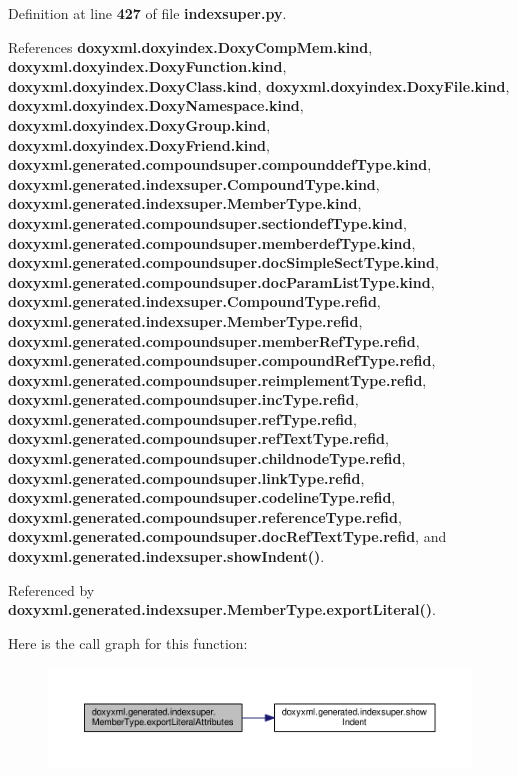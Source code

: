 Definition at line {\bf 427} of file {\bf indexsuper.\+py}.



References {\bf doxyxml.\+doxyindex.\+Doxy\+Comp\+Mem.\+kind}, {\bf doxyxml.\+doxyindex.\+Doxy\+Function.\+kind}, {\bf doxyxml.\+doxyindex.\+Doxy\+Class.\+kind}, {\bf doxyxml.\+doxyindex.\+Doxy\+File.\+kind}, {\bf doxyxml.\+doxyindex.\+Doxy\+Namespace.\+kind}, {\bf doxyxml.\+doxyindex.\+Doxy\+Group.\+kind}, {\bf doxyxml.\+doxyindex.\+Doxy\+Friend.\+kind}, {\bf doxyxml.\+generated.\+compoundsuper.\+compounddef\+Type.\+kind}, {\bf doxyxml.\+generated.\+indexsuper.\+Compound\+Type.\+kind}, {\bf doxyxml.\+generated.\+indexsuper.\+Member\+Type.\+kind}, {\bf doxyxml.\+generated.\+compoundsuper.\+sectiondef\+Type.\+kind}, {\bf doxyxml.\+generated.\+compoundsuper.\+memberdef\+Type.\+kind}, {\bf doxyxml.\+generated.\+compoundsuper.\+doc\+Simple\+Sect\+Type.\+kind}, {\bf doxyxml.\+generated.\+compoundsuper.\+doc\+Param\+List\+Type.\+kind}, {\bf doxyxml.\+generated.\+indexsuper.\+Compound\+Type.\+refid}, {\bf doxyxml.\+generated.\+indexsuper.\+Member\+Type.\+refid}, {\bf doxyxml.\+generated.\+compoundsuper.\+member\+Ref\+Type.\+refid}, {\bf doxyxml.\+generated.\+compoundsuper.\+compound\+Ref\+Type.\+refid}, {\bf doxyxml.\+generated.\+compoundsuper.\+reimplement\+Type.\+refid}, {\bf doxyxml.\+generated.\+compoundsuper.\+inc\+Type.\+refid}, {\bf doxyxml.\+generated.\+compoundsuper.\+ref\+Type.\+refid}, {\bf doxyxml.\+generated.\+compoundsuper.\+ref\+Text\+Type.\+refid}, {\bf doxyxml.\+generated.\+compoundsuper.\+childnode\+Type.\+refid}, {\bf doxyxml.\+generated.\+compoundsuper.\+link\+Type.\+refid}, {\bf doxyxml.\+generated.\+compoundsuper.\+codeline\+Type.\+refid}, {\bf doxyxml.\+generated.\+compoundsuper.\+reference\+Type.\+refid}, {\bf doxyxml.\+generated.\+compoundsuper.\+doc\+Ref\+Text\+Type.\+refid}, and {\bf doxyxml.\+generated.\+indexsuper.\+show\+Indent()}.



Referenced by {\bf doxyxml.\+generated.\+indexsuper.\+Member\+Type.\+export\+Literal()}.



Here is the call graph for this function\+:
\nopagebreak
\begin{figure}[H]
\begin{center}
\leavevmode
\includegraphics[width=350pt]{d0/da4/classdoxyxml_1_1generated_1_1indexsuper_1_1MemberType_af49d23a581e51a358d947271110c7421_cgraph}
\end{center}
\end{figure}




